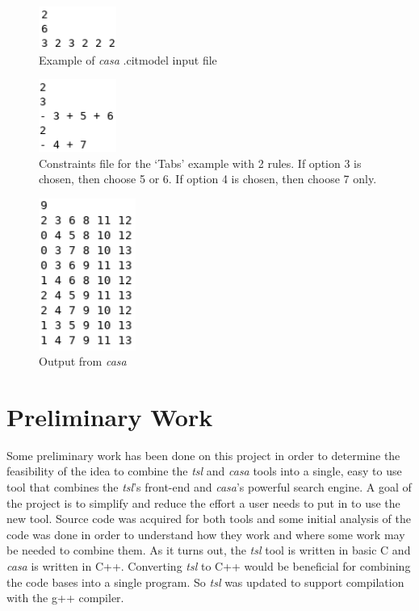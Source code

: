 \documentclass[a4full,12pt]{article}
\begin{document}
\begin{figure}[htb]
\centering
\includegraphics[width=1in,keepaspectratio]{images/casa_citmodel_input.png}
\caption{Example of \emph{casa} .citmodel input file}
\label{fig:casa_citmodel_input}
\end{figure}

\begin{figure}[htb]
\centering
\includegraphics[width=1in,keepaspectratio]{images/casa_constraints.png}
\caption{Constraints file for the `Tabs' example with 2 rules. If option 3 is chosen, then choose 5 or 6. If option 4 is chosen, then choose 7 only.}
\label{fig:casa_constraints}
\end{figure}

\begin{figure}[htb]
\centering
\includegraphics[width=1.25in,keepaspectratio]{images/casa_output.png}
\caption{Output from \emph{casa}}
\label{fig:casa_output}
\end{figure}

\section{Preliminary Work}
Some preliminary work has been done on this project in order to determine the
  feasibility of the idea to combine the \emph{tsl} and \emph{casa} tools into 
  a single, easy to use tool that combines the \emph{tsl}'s front-end and \emph{casa}'s powerful search engine. A goal of the project is to simplify and reduce the
  effort a user needs to put in to use the new tool. Source code was acquired for
  both tools and some initial analysis of the code was done in order to understand
  how they work and where some work may be needed to combine them. As it
  turns out, the \emph{tsl} tool is written in basic C and \emph{casa} is written
  in C++. Converting \emph{tsl} to C++ would be beneficial for combining the 
  code bases into a single program. So \emph{tsl} was updated to support compilation
  with the g++ compiler.
\end{document}
